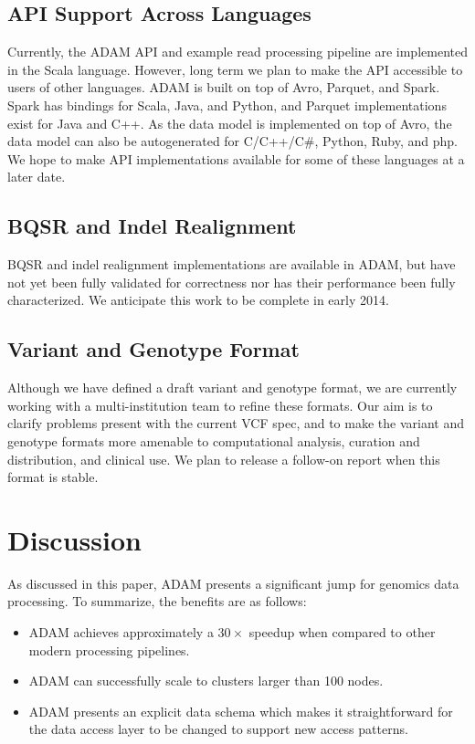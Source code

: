 \documentclass[10pt,twocolumn]{article}
\theoremstyle{plain}
\begin{document}
\subsection{API Support Across Languages}
\label{sec:api-support-across-languages}

Currently, the ADAM API and example read processing pipeline are implemented in the Scala language. However, long
term we plan to make the API accessible to users of other languages. ADAM is built on top of Avro, Parquet, and Spark.
Spark has bindings for Scala, Java, and Python, and Parquet implementations exist for Java and C++. As the data model
is implemented on top of Avro, the data model can also be auto\-generated for C/C++/C\#, Python, Ruby, and php. We hope
to make API implementations available for some of these languages at a later date.

\subsection{BQSR and Indel Realignment}
\label{sec:future-bqsr-ir}

BQSR and indel realignment implementations are available in ADAM, but have not yet been fully validated for correctness
nor has their performance been fully characterized. We anticipate this work to be complete in early 2014.

\subsection{Variant and Genotype Format}
\label{sec:variant-genotype-format-future}

Although we have defined a draft variant and genotype format, we are currently working with a multi-institution team to
refine these formats. Our aim is to clarify problems present with the current VCF spec, and to make the variant and genotype
formats more amenable to computational analysis, curation and distribution, and clinical use. We plan to release a follow-on
report when this format is stable.

\section{Discussion}
\label{sec:discussion}

As discussed in this paper, ADAM presents a significant jump for genomics data processing. To summarize, the benefits are as
follows:

\begin{itemize}
\item ADAM achieves approximately a $30\times$ speedup when compared to other modern processing pipelines.
\item ADAM can successfully scale to clusters larger than 100 nodes.
\item ADAM presents an explicit data schema which makes it straightforward for the data access layer to be changed
to support new access patterns.
\end{itemize}
\end{document}
